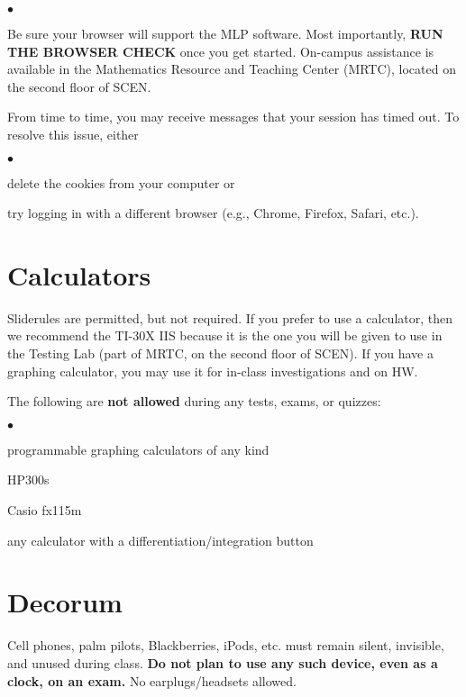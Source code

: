 \documentclass[margin,line,pifont,palatino,courier]{res}
\newenvironment{list1}{
  \begin{list}{\ding{113}}{%
      \setlength{\itemsep}{0in}
      \setlength{\parsep}{0in} \setlength{\parskip}{0in}
      \setlength{\topsep}{0in} \setlength{\partopsep}{0in}
      \setlength{\leftmargin}{0.17in}}}{\end{list}}
\newenvironment{list2}{
  \begin{list}{$\bullet$}{%
      \setlength{\itemsep}{0in}
      \setlength{\parsep}{0in} \setlength{\parskip}{0in}
      \setlength{\topsep}{0in} \setlength{\partopsep}{0in}
      \setlength{\leftmargin}{0.2in}}}{\end{list}}
\begin{document}
\begin{resume}
\begin{list1}
\begin{list2}
	\end{list2}
\item Be sure your browser will support the MLP software.  Most importantly, {\bf RUN THE BROWSER CHECK} once you get started. On-campus assistance is available in the Mathematics Resource and Teaching Center (MRTC), located on the second floor of SCEN.  
\item From time to time, you may receive messages that your session has timed out. To resolve this issue, either 
	\begin{list2}
	\item delete the cookies from your computer or 
	\item try logging in with a different browser (e.g., Chrome, Firefox, Safari, etc.).
	\end{list2}
\end{list1}

\section{\sc Calculators} Sliderules are permitted, but not required.  If you prefer to use a calculator, then we recommend the TI-30X IIS because it is the one you will be given to use in the Testing Lab (part of MRTC, on the second floor of SCEN).  If you have a graphing calculator, you may use it for in-class investigations and on HW.

The following are {\bf not allowed} during any tests, exams, or quizzes:
\begin{list2} 
\item programmable graphing calculators of any kind
\item HP300s 
\item Casio fx115m 
\item any calculator with a differentiation/integration button 
\end{list2}  

\section{\sc Decorum} Cell phones, palm pilots, Blackberries, iPods, etc. must remain silent, invisible, and unused during class.  {\bf Do not plan to use any such device, even as a clock, on an exam.} No earplugs/headsets allowed.


\end{resume}
\end{document}
